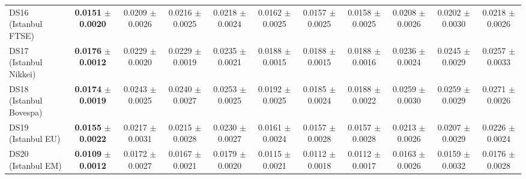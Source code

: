 \begin{table}[t]
{{\begin{tabular}{lcccccccccc}
DS16 (Istanbul FTSE) & \textbf{0.0151} $\pm$ \textbf{0.0020} & 0.0209 $\pm$ 0.0026 & 0.0216 $\pm$ 0.0025 & 0.0218 $\pm$ 0.0024 & 0.0162 $\pm$ 0.0025 & 0.0157 $\pm$ 0.0025 & 0.0158 $\pm$ 0.0025 & 0.0208 $\pm$ 0.0026 & 0.0202 $\pm$ 0.0030 & 0.0218 $\pm$ 0.0026 \\
DS17 (Istanbul Nikkei) & \textbf{0.0176} $\pm$ \textbf{0.0012} & 0.0229 $\pm$ 0.0020 & 0.0229 $\pm$ 0.0019 & 0.0235 $\pm$ 0.0021 & 0.0188 $\pm$ 0.0015 & 0.0188 $\pm$ 0.0015 & 0.0188 $\pm$ 0.0016 & 0.0236 $\pm$ 0.0024 & 0.0245 $\pm$ 0.0029 & 0.0257 $\pm$ 0.0033 \\
DS18 (Istanbul Bovespa) & \textbf{0.0174} $\pm$ \textbf{0.0019} & 0.0243 $\pm$ 0.0025 & 0.0240 $\pm$ 0.0027 & 0.0253 $\pm$ 0.0025 & 0.0192 $\pm$ 0.0025 & 0.0185 $\pm$ 0.0024 & 0.0188 $\pm$ 0.0022 & 0.0259 $\pm$ 0.0030 & 0.0259 $\pm$ 0.0029 & 0.0271 $\pm$ 0.0026 \\
DS19 (Istanbul EU) & \textbf{0.0155} $\pm$ \textbf{0.0022} & 0.0217 $\pm$ 0.0031 & 0.0215 $\pm$ 0.0028 & 0.0230 $\pm$ 0.0027 & 0.0161 $\pm$ 0.0024 & 0.0157 $\pm$ 0.0028 & 0.0157 $\pm$ 0.0028 & 0.0213 $\pm$ 0.0026 & 0.0207 $\pm$ 0.0029 & 0.0226 $\pm$ 0.0024 \\
DS20 (Istanbul EM) & \textbf{0.0109} $\pm$ \textbf{0.0012} & 0.0172 $\pm$ 0.0027 & 0.0167 $\pm$ 0.0021 & 0.0179 $\pm$ 0.0020 & 0.0115 $\pm$ 0.0021 & 0.0112 $\pm$ 0.0018 & 0.0112 $\pm$ 0.0017 & 0.0163 $\pm$ 0.0026 & 0.0159 $\pm$ 0.0032 & 0.0176 $\pm$ 0.0028 \\
\bottomrule
\end{tabular}%
}%
}
\end{table}
